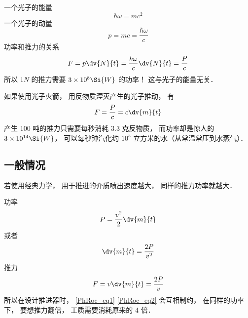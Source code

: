 
\begin{issues}
\issueDraft
\end{issues}

一个光子的能量
\begin{equation}
\hbar\omega = mc^2
\end{equation}
一个光子的动量
\begin{equation}
p = mc = \frac{\hbar\omega}{c}
\end{equation}
功率和推力的关系
\begin{equation}
F = p \dv{N}{t} = \frac{\hbar\omega}{c}\dv{N}{t} = \frac{P}{c}
\end{equation}
所以 $1N$ 的推力需要 $3\times 10^8\Si{W}$ 的功率！ 这与光子的能量无关．

如果使用光子火箭， 用反物质湮灭产生的光子推动， 有
\begin{equation}
F = \frac{P}{c} = c\dv{m}{t}
\end{equation}
产生 100 吨的推力只需要每秒消耗 3.3 克反物质， 而功率却是惊人的 $3\times 10^{14}\Si{W}$， 可以每秒钟汽化约 $10^5$ 立方米的水（从常温常压到水蒸气）．

\subsection{一般情况}
若使用经典力学， 用于推进的介质喷出速度越大， 同样的推力功率就越大．

功率
\begin{equation}
P = \frac{v^2}{2}\dv{m}{t}
\end{equation}
或者
\begin{equation}\label{PhRoc_eq1}
\dv{m}{t} = \frac{2P}{v^2}
\end{equation}
推力
\begin{equation}\label{PhRoc_eq2}
F = v\dv{m}{t} = \frac{2P}{v}
\end{equation}
所以在设计推进器时， \autoref{PhRoc_eq1} \autoref{PhRoc_eq2} 会互相制约， 在同样的功率下， 要想推力翻倍， 工质需要消耗原来的 4 倍．

